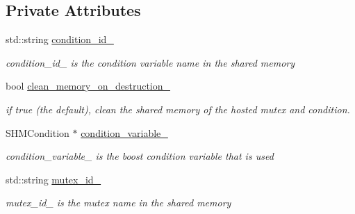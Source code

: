 \subsection*{Private Attributes}
\begin{DoxyCompactItemize}
\item 
\mbox{\label{classshared__memory_1_1ConditionVariable_a496feeef1a7fec080435b68a79bc163d}} 
std\+::string \hyperlink{classshared__memory_1_1ConditionVariable_a496feeef1a7fec080435b68a79bc163d}{condition\+\_\+id\+\_\+}
\begin{DoxyCompactList}\small\item\em condition\+\_\+id\+\_\+ is the condition variable name in the shared memory \end{DoxyCompactList}\item 
\mbox{\label{classshared__memory_1_1ConditionVariable_a872a5c9305c0dff22ec085b8c8306a0d}} 
bool \hyperlink{classshared__memory_1_1ConditionVariable_a872a5c9305c0dff22ec085b8c8306a0d}{clean\+\_\+memory\+\_\+on\+\_\+destruction\+\_\+}
\begin{DoxyCompactList}\small\item\em if true (the default), clean the shared memory of the hosted mutex and condition. \end{DoxyCompactList}\item 
\mbox{\label{classshared__memory_1_1ConditionVariable_a37c6e1a6ca44d30c2a29990e4460803b}} 
S\+H\+M\+Condition $\ast$ \hyperlink{classshared__memory_1_1ConditionVariable_a37c6e1a6ca44d30c2a29990e4460803b}{condition\+\_\+variable\+\_\+}
\begin{DoxyCompactList}\small\item\em condition\+\_\+variable\+\_\+ is the boost condition variable that is used \end{DoxyCompactList}\item 
\mbox{\label{classshared__memory_1_1ConditionVariable_ab8221877ff8551e608d5d4691d3679ae}} 
std\+::string \hyperlink{classshared__memory_1_1ConditionVariable_ab8221877ff8551e608d5d4691d3679ae}{mutex\+\_\+id\+\_\+}
\begin{DoxyCompactList}\small\item\em mutex\+\_\+id\+\_\+ is the mutex name in the shared memory \end{DoxyCompactList}\end{DoxyCompactItemize}


